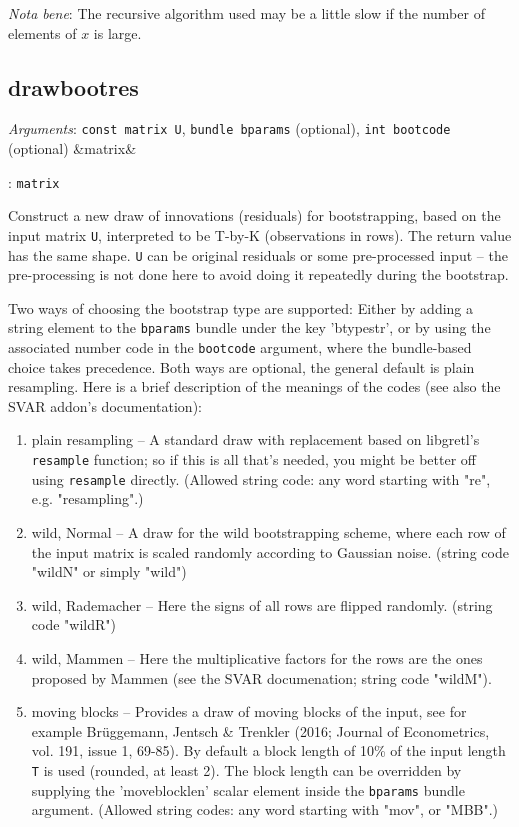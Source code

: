 \documentclass[11pt,english]{article}
\newcommand{\ArgRet}[2]{%
  {\it Arguments}: {#1}%
  \ifx&#2&%
  \else
  \par\smallskip\noindent {\it Return type}: \texttt{#2}
  \fi%
  \par\medskip\par%
  }
\begin{document}
\emph{Nota bene}: The recursive algorithm used may be a little slow if
the number of elements of $x$ is large.

\subsection{drawbootres}

\ArgRet{\texttt{const matrix U}, \texttt{bundle bparams} (optional),
\texttt{int bootcode} (optional)}{matrix}
Construct a new draw of innovations (residuals) for bootstrapping, based on the
input matrix \texttt{U}, interpreted to be T-by-K (observations in rows). The
return value has the same shape. \texttt{U} can be original residuals or some
pre-processed input -- the pre-processing is not done here to avoid doing it
repeatedly during the bootstrap.

Two ways of choosing the bootstrap type are supported: Either by adding a
string element to the \texttt{bparams} bundle under the key 'btypestr', or by
using the associated number code in the \texttt{bootcode} argument, where the
bundle-based choice takes precedence. Both ways are optional, the general
default is plain resampling. Here is a brief description of the meanings of the
codes (see also the SVAR addon's documentation):

\begin{enumerate}
  \item plain resampling -- A standard draw with replacement based on
    libgretl's \texttt{resample} function; so if this is all that's needed, you
    might be better off using \texttt{resample} directly. (Allowed string code:
    any word starting with "re", e.g. "resampling".)

  \item wild, Normal -- A draw for the wild bootstrapping scheme, where each
    row of the input matrix is scaled randomly according to Gaussian noise.
    (string code "wildN" or simply "wild")
  \item wild, Rademacher -- Here the signs of all rows are flipped randomly. 
    (string code "wildR") 
  \item wild, Mammen -- Here the multiplicative factors for the rows are the
    ones proposed by Mammen (see the SVAR documenation; string code "wildM").
  \item moving blocks -- Provides a draw of moving blocks of the input, see 
    for example Brüggemann, Jentsch \& Trenkler (2016; Journal of Econometrics,
    vol. 191, issue 1, 69-85). By default a block length of 10\% of the input 
    length \texttt{T} is used (rounded, at least 2). The block length can be
    overridden by supplying the 'moveblocklen' scalar element inside the
    \texttt{bparams} bundle argument. (Allowed string codes: any word starting
    with "mov", or "MBB".)

\end{enumerate}
\end{document}
